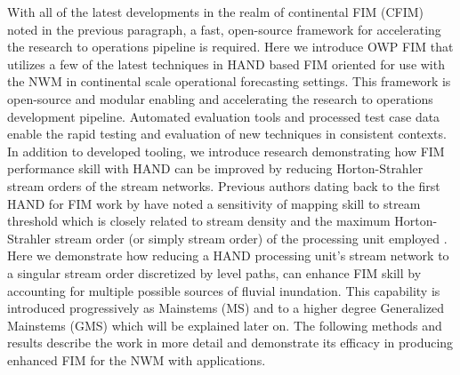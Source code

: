 With all of the latest developments in the realm of continental FIM (CFIM) noted in the previous paragraph, a fast, open-source framework for accelerating the research to operations pipeline is required.
Here we introduce OWP FIM that utilizes a few of the latest techniques in HAND based FIM oriented for use with the NWM in continental scale operational forecasting settings. 
This framework is open-source and modular enabling and accelerating the research to operations development pipeline.
Automated evaluation tools and processed test case data enable the rapid testing and evaluation of new techniques in consistent contexts.
In addition to developed tooling, we introduce research demonstrating how FIM performance skill with HAND can be improved by reducing Horton-Strahler stream orders \cite{horton1945erosional,strahler1952hypsometric,strahler1952hypsometric} of the stream networks.
Previous authors dating back to the first HAND for FIM work by  have noted a sensitivity of mapping skill to stream threshold which is closely related to stream density and the maximum Horton-Strahler stream order (or simply stream order) of the processing unit employed \cite{zhang2018comparative,mcgehee2016modified,li2020evaluation}.
Here we demonstrate how reducing a HAND processing unit's stream network to a singular stream order discretized by level paths, can enhance FIM skill by accounting for multiple possible sources of fluvial inundation.
This capability is introduced progressively as Mainstems (MS) and to a higher degree Generalized Mainstems (GMS) which will be explained later on.
The following methods and results describe the work in more detail and demonstrate its efficacy in producing enhanced FIM for the NWM with applications.
%
